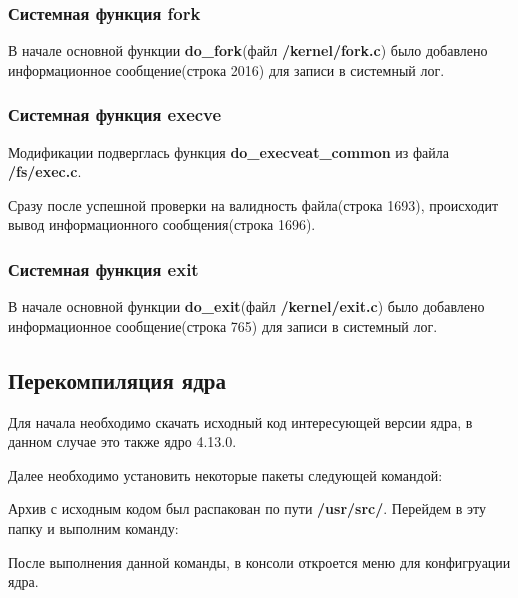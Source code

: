 \subsubsection{Системная функция fork}
В начале основной функции \textbf{do\_fork}(файл \textbf{/kernel/fork.c}) было добавлено информационное сообщение(строка 2016) для записи в системный лог.


\subsubsection{Системная функция execve}
Модификации подверглась функция \textbf{do\_execveat\_common} из файла \textbf{/fs/exec.c}. 

Сразу после успешной проверки на валидность файла(строка 1693), происходит вывод информационного сообщения(строка 1696).
\subsubsection{Системная функция exit}
В начале основной функции \textbf{do\_exit}(файл \textbf{/kernel/exit.c}) было добавлено информационное сообщение(строка 765) для записи в системный лог.



\subsection{Перекомпиляция ядра}
Для начала необходимо скачать исходный код интересующей версии ядра, в данном случае это также ядро 4.13.0.

Далее необходимо установить некоторые пакеты следующей командой:


Архив с исходным кодом был распакован по пути \textbf{/usr/src/}. Перейдем в эту папку и выполним команду:

После выполнения данной команды, в консоли откроется меню для конфигруации ядра.

